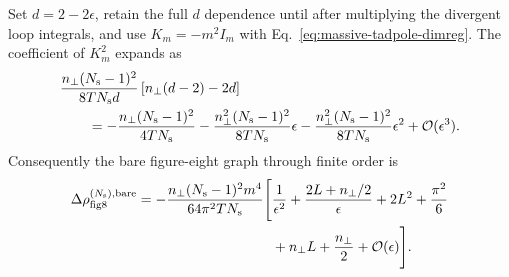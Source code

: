 Set $d=2-2\epsilon$, retain the full $d$ dependence until after multiplying
the divergent loop integrals, and use $K_m=-m^2I_m$ with
Eq.~\eqref{eq:massive-tadpole-dimreg}.  The coefficient of $K_m^2$ expands as
\begin{align}
  &\frac{n_\perp(N_{\mathrm s}-1)^2}{8TN_{\mathrm s}d}
   \left[n_\perp(d-2)-2d\right]
  \notag\\
  &\qquad=-\frac{n_\perp(N_{\mathrm s}-1)^2}{4TN_{\mathrm s}}
   -\frac{n_\perp^2(N_{\mathrm s}-1)^2}{8TN_{\mathrm s}}\epsilon
   -\frac{n_\perp^2(N_{\mathrm s}-1)^2}{8TN_{\mathrm s}}\epsilon^2
   +\mathcal O(\epsilon^3).
  \label{eq:n-string-evanescent-coefficient}
\end{align}
Consequently the bare figure-eight graph through finite order is
\begin{align}
  \Delta\rho_{\mathrm{fig8}}^{(N_{\mathrm s}),\mathrm{bare}}
  =-\frac{n_\perp(N_{\mathrm s}-1)^2m^4}
          {64\pi^2TN_{\mathrm s}}
  \Bigg[
    &\frac{1}{\epsilon^2}
    +\frac{2L+n_\perp/2}{\epsilon}
    +2L^2+\frac{\pi^2}{6}
  \notag\\
    &+n_\perp L+\frac{n_\perp}{2}
    +\mathcal O(\epsilon)
  \Bigg].
  \label{eq:n-string-figure-eight-bare}
\end{align}


